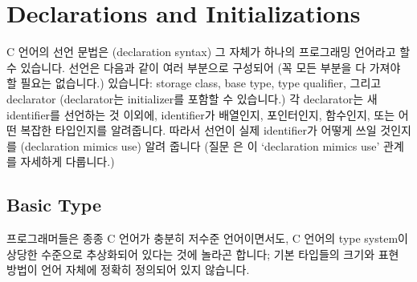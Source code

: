 \chapter{Declarations and Initializations}	\label{chap:decinit}

C 언어의 선언 문법은 (declaration syntax) 그 자체가 하나의 프로그래밍
언어라고 할 수 있습니다.  선언은 다음과 같이 여러 부분으로 구성되어 (꼭
모든 부분을 다 가져야 할 필요는 없습니다.) 있습니다: storage class,
base type, type qualifier, 그리고 declarator (declarator는 
initializer를 포함할 수 있습니다.)  각 declarator는 새 identifier를
선언하는 것 이외에, identifier가 배열인지, 포인터인지, 함수인지, 또는
어떤 복잡한 타입인지를 알려줍니다.  따라서 선언이 실제 identifier가
어떻게 쓰일 것인지를 (declaration mimics use) 알려 줍니다 (질문 은 이 
`declaration mimics use' 관계를 자세하게 다룹니다.)

\section{Basic Type}	\label{sec:bastype}
프로그래머들은 종종 C 언어가 충분히 저수준 언어이면서도, C 언어의
type system이 상당한 수준으로 추상화되어 있다는 것에 놀라곤 합니다;
기본 타입들의 크기와 표현 방법이 언어 자체에 정확히 정의되어 있지 않습니다.

